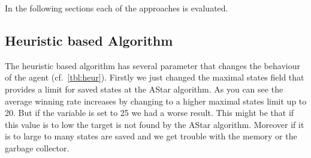 In the following sections each of the approaches is evaluated. 


\subsection{Heuristic based Algorithm} 

The heuristic based algorithm has several parameter that changes the behaviour of the agent (cf.~\cref{tbl:heur}).
Firstly we just changed the maximal states field that provides a limit for saved states at
the AStar algorithm. As you can see the average winning rate increases by changing to a higher maximal states limit up to 20.
But if the variable is set to 25 we had a worse result. This might be that if this value is to low the target is not found 
by the AStar algorithm. Moreover if it is to large to many states are saved and we get trouble with the memory or the
garbage collector.


